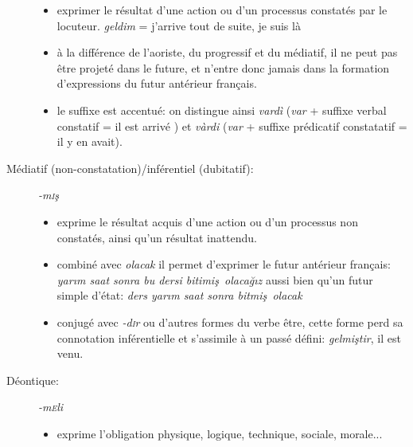 \documentclass{cours}
\newcommand{\ch}{\c{s}}
\newcommand{\ug}{\u{g}}
\newcommand{\sci}{\textsc{i}}
\newcommand{\sce}{\textsc{e}}
\begin{document}
\begin{description}
          \begin{itemize}
              \item exprimer le résultat d'une action ou d'un processus constatés par le locuteur. \textsl{geldim} = j'arrive tout de suite, je suis là
              \item à la différence de l'aoriste, du progressif et du médiatif, il ne peut pas être projeté dans le future, et n'entre donc jamais dans la formation d'expressions du futur antérieur français.
              \item le suffixe est accentué: on distingue ainsi \textsl{vard\`i} (\textsl{var} + suffixe verbal constatif = \og il est arrivé \fg) et \textsl{v\`ardi} (\textsl{var} + suffixe prédicatif constatatif = \og il y en avait\fg).
          \end{itemize}
    \item [Médiatif (non-constatation)/inférentiel (dubitatif):] \textsl{-m\sci\ch}
          \begin{itemize}
              \item exprime le résultat acquis d'une action ou d'un processus non constatés, ainsi qu'un résultat inattendu.
              \item combiné avec \textsl{olacak} il permet d'exprimer le futur antérieur français: \textsl{yar\i m saat sonra bu dersi bitimi\ch \ olaca\ug \i z} aussi bien qu'un futur simple d'état: \textsl{ders yar\i m saat sonra bitmi\ch \ olacak}
              \item conjugé avec \textsl{-d\sci r} ou d'autres formes du verbe être, cette forme perd sa connotation inférentielle et s'assimile à un passé défini: \textsl{gelmi\ch tir}, il est venu.
          \end{itemize}
    \item [Déontique:] \textsl{-m\sce li}
          \begin{itemize}
              \item exprime l'obligation physique, logique, technique, sociale, morale...
          \end{itemize}
\end{description}
\end{document}
